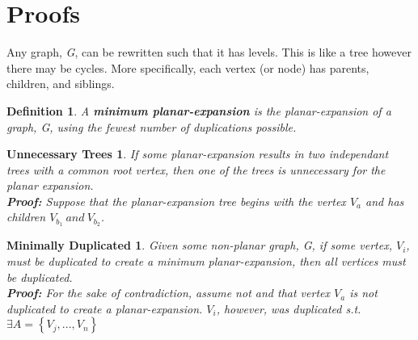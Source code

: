 \documentclass{article}
\newtheorem*{duplication}{Minimally Duplicated}
\newtheorem*{trees}{Unnecessary Trees}
\newtheorem{mydef}{Definition}
\begin{document}


\section{Proofs}
Any graph, \emph{G}, can be rewritten such that it has levels.  This is like a tree however there may be cycles.  More specifically, each vertex (or node) has parents, children, and siblings.

\theoremstyle{definition}
\begin{mydef}
A \textbf{minimum planar-expansion} is the planar-expansion of a graph, G, using the fewest number of duplications possible.
\end{mydef}

\begin{trees}
If some planar-expansion results in two independant trees with a common root vertex, then one of the trees is unnecessary for the planar expansion.\\
\textbf{Proof: }Suppose that the planar-expansion tree begins with the vertex $V_a$ and has children $V_b_1\ and\ V_b_2$.
\end{trees}

\begin{duplication}
Given some non-planar graph, G, if some vertex, $V_i$, must be duplicated to create a minimum planar-expansion, then all vertices must be duplicated.\\
\textbf{Proof: }For the sake of contradiction, assume not and that vertex $V_a$ is not duplicated to create a planar-expansion. $V_i$, however, was duplicated s.t. $\exists A = \left\{V_j,...,V_n\right\}$
\end{duplication}
\end{document}
